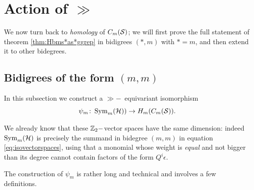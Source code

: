\section{Action of $\gg$}
We now turn back to \emph{homology} of $C_m(\mathcal{S})$; we will first prove the full statement of theorem
\ref{thm:Hbms*as*ggrep} in bidigrees $(*,m)$ with $*=m$, and then extend it to other bidegrees.

\subsection{Bidigrees of the form $(m,m)$}
In this subsection we construct a $\gg-$~equivariant isomorphism 
\[
\psi_m\colon \operatorname{Sym}_m(\mathcal{H}))\to H_m(C_m(\mathcal{S})).
\]

We already know that these $\mathbb{Z}_2-$vector spaces have the same dimension:
indeed $\operatorname{Sym}_m(\mathcal{H})$ is precisely the summand in bidegree $(m,m)$ in equation
\ref{eq:isovectorspaces}, using that a monomial
 whose
weight is \emph{equal} and not bigger than its degree cannot contain factors of the form
$Q^i\epsilon$.
% 


The construction of $\psi_m$ is rather long and technical and involves a few definitions.


